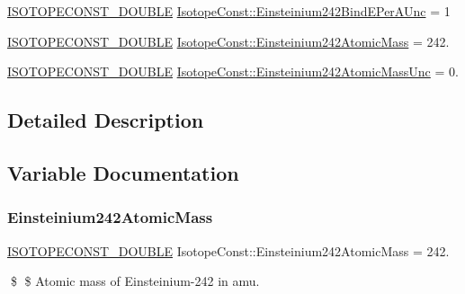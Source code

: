 \begin{DoxyCompactItemize}
\mbox{\hyperlink{group___isotope_const-_macros_ga8f45a7272ce02c0b4c65c44636ed719a}{I\+S\+O\+T\+O\+P\+E\+C\+O\+N\+S\+T\+\_\+\+D\+O\+U\+B\+LE}} \mbox{\hyperlink{group___isotope_const-_einsteinium-_es242_ga8fe9af28bd839ce0b416d7084ef096a6}{Isotope\+Const\+::\+Einsteinium242\+Bind\+E\+Per\+A\+Unc}} = 1
\item 
\mbox{\hyperlink{group___isotope_const-_macros_ga8f45a7272ce02c0b4c65c44636ed719a}{I\+S\+O\+T\+O\+P\+E\+C\+O\+N\+S\+T\+\_\+\+D\+O\+U\+B\+LE}} \mbox{\hyperlink{group___isotope_const-_einsteinium-_es242_gaaa6616a5d74446b5da17d96cbaca4bc2}{Isotope\+Const\+::\+Einsteinium242\+Atomic\+Mass}} = 242.
\item 
\mbox{\hyperlink{group___isotope_const-_macros_ga8f45a7272ce02c0b4c65c44636ed719a}{I\+S\+O\+T\+O\+P\+E\+C\+O\+N\+S\+T\+\_\+\+D\+O\+U\+B\+LE}} \mbox{\hyperlink{group___isotope_const-_einsteinium-_es242_gabd48e7eb753c0c0ee88bb23f71c6fc5a}{Isotope\+Const\+::\+Einsteinium242\+Atomic\+Mass\+Unc}} = 0.
\end{DoxyCompactItemize}


\subsection{Detailed Description}


\subsection{Variable Documentation}
\mbox{\label{group___isotope_const-_einsteinium-_es242_gaaa6616a5d74446b5da17d96cbaca4bc2}} 
\subsubsection{\texorpdfstring{Einsteinium242\+Atomic\+Mass}{Einsteinium242AtomicMass}}
{\footnotesize\ttfamily \mbox{\hyperlink{group___isotope_const-_macros_ga8f45a7272ce02c0b4c65c44636ed719a}{I\+S\+O\+T\+O\+P\+E\+C\+O\+N\+S\+T\+\_\+\+D\+O\+U\+B\+LE}} Isotope\+Const\+::\+Einsteinium242\+Atomic\+Mass = 242.}

\$ \$ Atomic mass of Einsteinium-\/242 in amu. \mbox{\label{group___isotope_const-_einsteinium-_es242_gabd48e7eb753c0c0ee88bb23f71c6fc5a}} 
